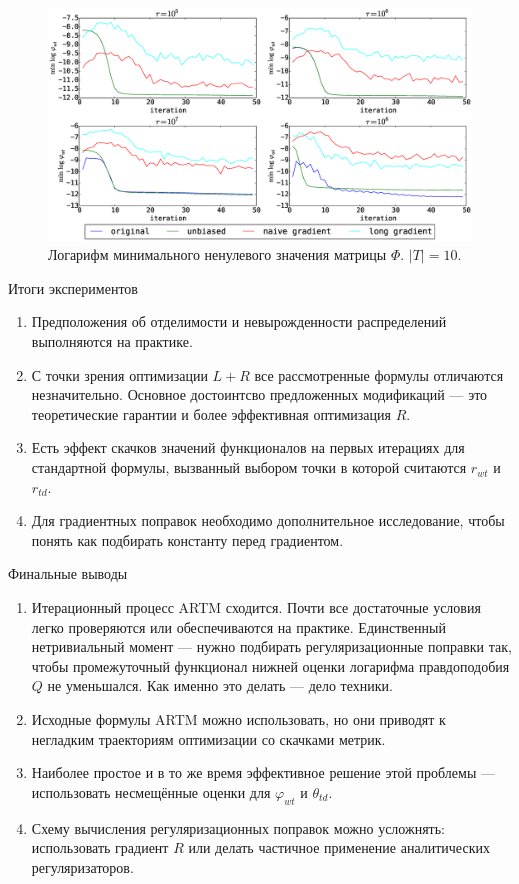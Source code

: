 \documentclass[utf8]{beamer}
\renewcommand{\phi}{\varphi}
\begin{document}
\begin{frame}
\begin{figure}[h]
	\centering
	\caption{Логарифм минимального ненулевого значения матрицы $\Phi$. $|T| = 10$.}    
	\includegraphics[width=1.0\linewidth]{presentation_pictures/topics_10_minPhi_values}
\end{figure}
\end{frame}
	
	
\begin{frame}{Итоги экспериментов}
\begin{enumerate}
\item Предположения об отделимости и невырожденности распределений выполняются на практике.
\item С точки зрения оптимизации $L +  R$ все рассмотренные формулы отличаются незначительно. Основное достоинтсво предложенных модификаций --- это теоретические гарантии и более эффективная оптимизация $R$.
\item Есть эффект скачков значений функционалов на первых итерациях для стандартной формулы, вызванный выбором точки в которой считаются $r_{wt}$ и $r_{td}$.
\item Для градиентных поправок необходимо дополнительное исследование, чтобы понять как подбирать константу перед градиентом.
\end{enumerate}
\end{frame}

\begin{frame}{Финальные выводы}
\begin{enumerate}
\item Итерационный процесс ARTM сходится. Почти все  достаточные условия легко проверяются или обеспечиваются на практике. Единственный нетривиальный момент --- нужно подбирать регуляризационные поправки так, чтобы промежуточный функционал нижней оценки логарифма правдоподобия $Q$ не уменьшался. Как именно это делать --- дело техники.
\item Исходные формулы ARTM можно использовать, но они приводят к негладким траекториям оптимизации со скачками метрик.
\item Наиболее простое и в то же время эффективное решение этой проблемы --- использовать несмещённые оценки для $\phi_{wt}$ и $\theta_{td}$.
\item Схему вычисления регуляризационных поправок можно усложнять: использовать градиент $R$ или делать частичное применение аналитических регуляризаторов.
\end{enumerate}
\end{frame}
\end{document}
